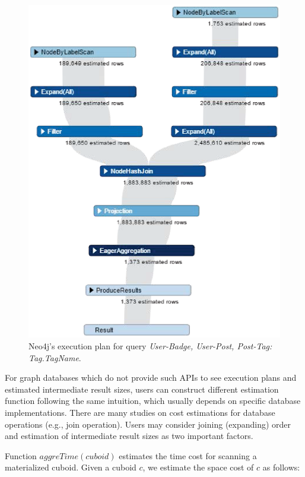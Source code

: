 	\begin {figure}[T]
	\centering
	\includegraphics[scale=0.6]{pic/61.eps}
	\caption{Neo4j's execution plan for query \textit{User-Badge, User-Post, Post-Tag: Tag.TagName}.}
	\label{fig:4:2}
\end{figure}

For graph databases which do not provide such APIs to see execution plans and estimated intermediate result sizes, users can construct different estimation function following the same intuition, which usually depends on specific database implementations. There are many studies on cost estimations for database operations (e.g., join operation). Users may consider joining (expanding) order \cite{DBLP:conf/pods/Chaudhuri98} and estimation of intermediate result sizes  \cite{DBLP:conf/edbt/SwamiS94} as two important factors.

Function \textbf{$aggreTime(cuboid)$} estimates the time cost for scanning a materialized cuboid. Given a cuboid $c$, we estimate the space cost of $c$ as follows:


